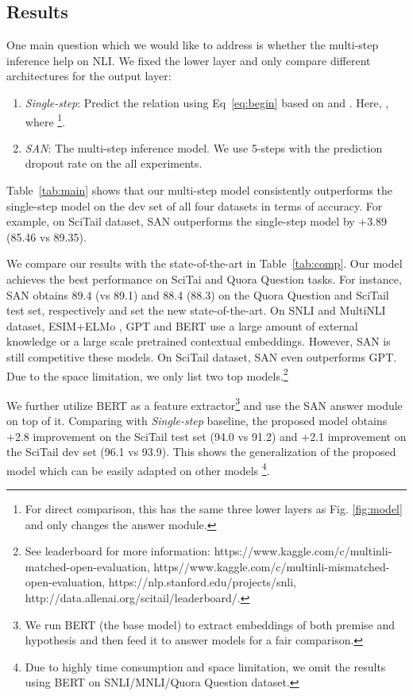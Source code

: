 \documentclass[11pt,a4paper]{article}
\begin{document}
\subsection{Results}
\label{sec:result}
One main question which we would like to address is whether the multi-step inference help on NLI. 
We fixed the lower layer and only compare different architectures for the output layer:\begin{enumerate}
\item \textit{Single-step}: Predict the relation using Eq~\ref{eq:begin} based on  and . Here, , where \footnote{For direct comparison, this has the same three lower layers as Fig. \ref{fig:model} and only changes the answer module.}.
\item \textit{SAN}: The multi-step inference model. We use 5-steps with the prediction dropout rate  on the all experiments.
\end{enumerate} 



Table~\ref{tab:main} shows that our multi-step model consistently outperforms the single-step model on the dev set of all four datasets in terms of accuracy. For example, on SciTail dataset, SAN outperforms the single-step model by +3.89 (85.46 vs 89.35). 

We compare our results with the state-of-the-art in Table~\ref{tab:comp}. Our model achieves the best performance on SciTai and Quora Question tasks. For instance, SAN obtains 89.4 (vs 89.1) and 88.4 (88.3) on the Quora Question and SciTail test set, respectively and set the new state-of-the-art. On SNLI and MultiNLI dataset, ESIM+ELMo \cite{peters2018deep}, GPT \cite{radford2018improving} and BERT \cite{devlin2018bert} use a large amount of external knowledge or a large scale pretrained contextual embeddings. However, SAN is still competitive these models. On SciTail dataset, SAN even outperforms GPT.  
Due to the space limitation, we only list two top models.\footnote{See leaderboard for more information: https://www.kaggle.com/c/multinli-matched-open-evaluation, https//www.kaggle.com/c/multinli-mismatched-open-evaluation, https://nlp.stanford.edu/projects/snli, http://data.allenai.org/scitail/leaderboard/.}

We further utilize BERT as a feature extractor\footnote{We run BERT (the base model) to extract embeddings of both premise and hypothesis and then feed it to answer models for a fair comparison.} and use the SAN answer module on top of it. Comparing with \textit{Single-step} baseline, the proposed model obtains +2.8 improvement on the SciTail test set (94.0 vs 91.2) and +2.1 improvement on the SciTail dev set (96.1 vs 93.9). This shows the generalization of the proposed model which can be easily adapted on other models \footnote{Due to highly time consumption and space limitation, we omit the results using BERT on SNLI/MNLI/Quora Question dataset.}.
\end{document}
